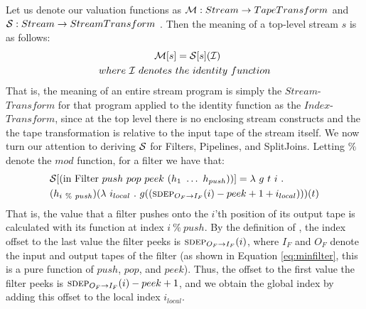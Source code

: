 Let us denote our valuation functions as ${\cal M}: Stream \ra
TapeTransform$ and ${\cal S}: Stream \ra StreamTransform$ .  Then the
meaning of a top-level stream $s$ is as follows:
\begin{align*}
&{\cal M} [s] = {\cal S}[s]({\cal I}) \\
where~{\cal I}~den&otes~the~identity~function
\end{align*}
That is, the meaning of an entire stream program is simply the
$Stream$-$Transform$ for that program applied to the identity function
as the $Index$-$Transform$, since at the top level there is no
enclosing stream constructs and the the tape transformation is
relative to the input tape of the stream itself.  We now turn our
attention to deriving ${\cal S}$ for Filters, Pipelines, and
SplitJoins.  Letting $\%$ denote the $mod$ function, for a filter we
have that:
\begin{align*}
&{\cal S} [(\mbox{in~Filter}~push~pop~peek~(h_1~\dots~h_{push}))] =
  \la~g~t~i~.~\\ &(h_{i~\%~push})(\la~i_{local}~.~g((\mi{I_F}{O_F}(i) - peek + 1 + i_{local})))(t)
\end{align*}
That is, the value that a filter pushes onto the $i$'th position of its
output tape is calculated with its function at index $i~\%~push$.  By
the definition of \sdep, the index offset to the last value the filter
peeks is $\mi{I_F}{O_F}(i)$, where $I_F$ and $O_F$ denote the input and
output tapes of the filter (as shown in Equation \ref{eq:minfilter},
this is a pure function of $push$, $pop$, and $peek$).  Thus, the offset
to the first value the filter peeks is $\mi{I_F}{O_F}(i) - peek + 1$,
and we obtain the global index by adding this offset to the local index
$i_{local}$.

